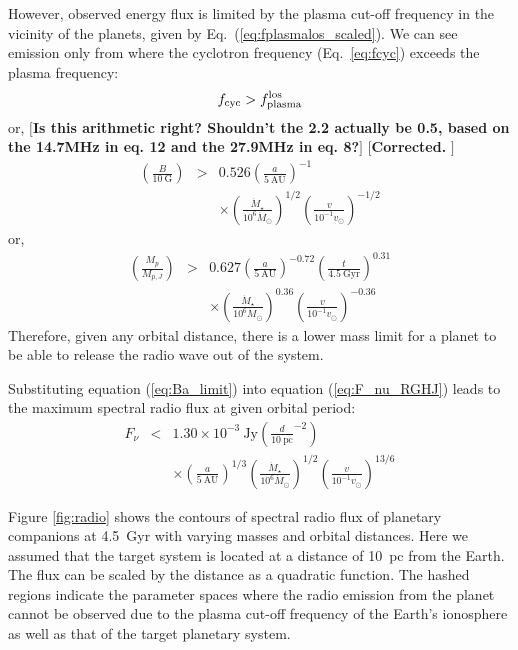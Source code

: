 \documentclass{emulateapj}
\def\memoYF#1{\color{red}$[${\bf #1}$]$ \color{black}}
\def\memoDS#1{\color{blue}$[${\bf #1}$]$ \color{black}}
\begin{document}
However, observed energy flux is limited by the plasma cut-off frequency in the vicinity of the planets, given by Eq.~(\ref{eq:fplasmalos_scaled}).
We can see emission only from where the cyclotron frequency (Eq.~\ref{eq:fcyc}) exceeds the plasma frequency:
\begin{equation}
\label{eq:fcyc>fplasma} f_{\rm cyc} > f_{\rm plasma}^{\rm los}
\end{equation} 
or, \memoDS{Is this arithmetic right?  Shouldn't the 2.2 actually be 0.5, based on the 14.7MHz in eq. 12 and the 27.9MHz in eq. 8?}\memoYF{Corrected. }
\begin{eqnarray}
 \left( \frac{B}{10~\mbox{G}} \right) &>& 0.526 \left( \frac{a}{5~\mbox{AU}} \right)^{-1} \\
 && \times \left( \frac{\dot M_\star}{10^6 \dot M_{\odot}} \right)^{1/2}  \left( \frac{v}{10^{-1}v_{\odot}} \right)^{-1/2} \label{eq:Ba_limit}
\end{eqnarray}
or, 
\begin{eqnarray}
 \left( \frac{M_p}{M_{p,J}} \right) &> & 0.627 \left( \frac{a}{5~\mbox{AU}} \right)^{-0.72} \left( \frac{t}{4.5~\mbox{Gyr}} \right)^{0.31} \\
 && \times \left( \frac{\dot M_\star}{10^6 \dot M_{\odot}} \right)^{0.36}  \left( \frac{v}{10^{-1}v_{\odot}} \right)^{-0.36} \label{eq:Ma_limit}
\end{eqnarray}
Therefore, given any orbital distance, there is a lower mass limit for a planet to be able to release the  radio wave out of the system. 

Substituting equation (\ref{eq:Ba_limit}) into equation (\ref{eq:F_nu_RGHJ}) leads to the maximum spectral radio flux at given orbital period:
\begin{eqnarray}
F_{\nu} &<& 1.30 \times 10^{-3}~\mbox{Jy} \left( \frac{d}{10~\mbox{pc}}^{-2} \right) \\
&& \times \left( \frac{a}{5~\mbox{AU}} \right)^{1/3}  \left( \frac{\dot M_\star}{10^6 \dot M_{\odot}} \right)^{1/2} \left( \frac{v}{10^{-1} v_{\odot}} \right)^{13/6}
\end{eqnarray}

Figure \ref{fig:radio} shows the contours of spectral radio flux of planetary companions at 4.5~Gyr with varying masses and orbital distances. Here we assumed that the target system is located at a distance of 10~pc from the Earth. The flux can be scaled by the distance as a quadratic function. 
The hashed regions indicate the parameter spaces where the radio emission from the planet cannot be observed due to the plasma cut-off frequency of the Earth's ionosphere as well as that of the target planetary system. 
\end{document}
